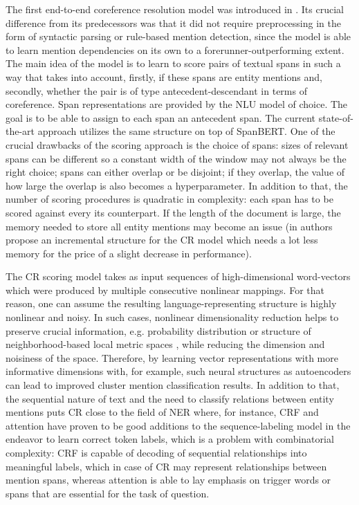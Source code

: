 The first end-to-end coreference resolution model was introduced in \cite{cr-Lee17}. Its crucial difference from its predecessors was that it did not require preprocessing in the form of syntactic parsing or rule-based mention detection, since the model is able to learn mention dependencies on its own to a forerunner-outperforming extent. 
The main idea of the model is to learn to score pairs of textual spans in such a way that takes into account, firstly, if these spans are entity mentions and, secondly, whether the pair is of type antecedent-descendant in terms of coreference.
Span representations are provided by the NLU model of choice. 
The goal is to be able to assign to each span an antecedent span. The current state-of-the-art approach \cite{cr-Joshi2019} utilizes the same structure on top of SpanBERT. 
One of the crucial drawbacks of the scoring approach is the choice of spans: sizes of relevant spans can be different so a constant width of the window may not always be the right choice; spans can either overlap or be disjoint; if they overlap, the value of how large the overlap is also becomes a hyperparameter. 
In addition to that, the number of scoring procedures is quadratic in complexity: each span has to be scored against every its counterpart. 
If the length of the document is large, the memory needed to store all entity mentions may become an issue (in \cite{cr-Xia2020} authors propose an incremental structure for the CR model which needs a lot less memory for the price of a slight decrease in performance).

The CR scoring model takes as input sequences of high-dimensional word-vectors which were produced by multiple consecutive nonlinear mappings. For that reason, one can assume the resulting language-representing structure is highly nonlinear and noisy. 
In such cases, nonlinear dimensionality reduction helps to preserve crucial information, e.g. probability distribution \cite{dr-VanderMaaten2014} or structure of neighborhood-based local metric spaces \cite{dr-McInnes2018}, while reducing the dimension and noisiness of the space. 
Therefore, by learning vector representations with more informative dimensions with, for example, such neural structures as autoencoders \cite{autoencoders-Zabalza2016,autoencoders-Sahay2019} can lead to improved cluster mention classification results. 
In addition to that, the sequential nature of text and the need to classify relations between entity mentions puts CR close to the field of NER where, for instance, CRF \cite{ner-Strakova2019,ner-Zhanming2019} and attention \cite{ner-Yamada2020,translation-Bahdanau2014} have proven to be good additions  to the sequence-labeling model in the endeavor to learn correct token labels, which is a problem with combinatorial complexity: CRF is capable of decoding of sequential relationships into meaningful labels, which in case of CR may represent relationships between mention spans, whereas attention is able to lay emphasis on trigger words or spans that are essential for the task of question.

